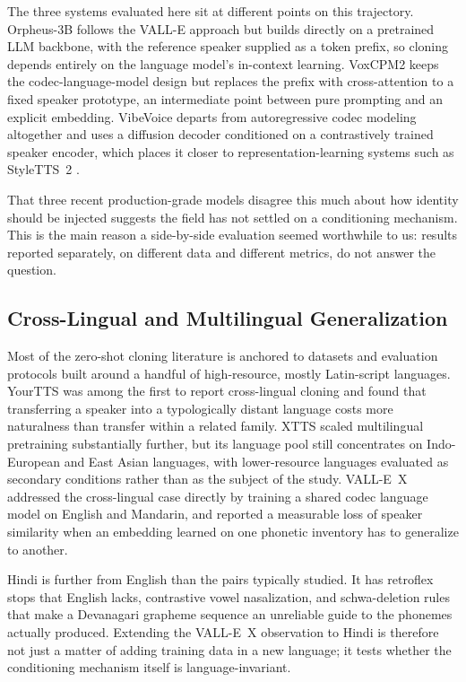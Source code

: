 \documentclass[conference]{IEEEtran}
\begin{document}
The three systems evaluated here sit at different points on this trajectory.
Orpheus-3B \cite{orpheus2024} follows the VALL-E approach but builds directly
on a pretrained LLM backbone, with the reference speaker supplied as a token
prefix, so cloning depends entirely on the language model's in-context
learning. VoxCPM2 \cite{voxcpm2024} keeps the codec-language-model design but
replaces the prefix with cross-attention to a fixed speaker prototype, an
intermediate point between pure prompting and an explicit embedding.
VibeVoice \cite{vibevoice2024} departs from autoregressive codec modeling
altogether and uses a diffusion decoder conditioned on a contrastively
trained speaker encoder, which places it closer to representation-learning
systems such as StyleTTS~2 \cite{li2023styletts2}.

That three recent production-grade models disagree this much about how
identity should be injected suggests the field has not settled on a
conditioning mechanism. This is the main reason a side-by-side evaluation
seemed worthwhile to us: results reported separately, on different data and
different metrics, do not answer the question.

\subsection{Cross-Lingual and Multilingual Generalization}
\label{sec:related-multilingual}

Most of the zero-shot cloning literature is anchored to datasets and
evaluation protocols built around a handful of high-resource, mostly
Latin-script languages. YourTTS \cite{casanova2022yourtts} was among the
first to report cross-lingual cloning and found that transferring a speaker
into a typologically distant language costs more naturalness than transfer
within a related family. XTTS \cite{casanova2024xtts} scaled multilingual
pretraining substantially further, but its language pool still concentrates
on Indo-European and East Asian languages, with lower-resource languages
evaluated as secondary conditions rather than as the subject of the study.
VALL-E~X \cite{zhang2023speak} addressed the cross-lingual case directly by
training a shared codec language model on English and Mandarin, and reported
a measurable loss of speaker similarity when an embedding learned on one
phonetic inventory has to generalize to another.

Hindi is further from English than the pairs typically studied. It has
retroflex stops that English lacks, contrastive vowel nasalization, and
schwa-deletion rules that make a Devanagari grapheme sequence an unreliable
guide to the phonemes actually produced. Extending the VALL-E~X observation
to Hindi is therefore not just a matter of adding training data in a new
language; it tests whether the conditioning mechanism itself is
language-invariant.
\end{document}
